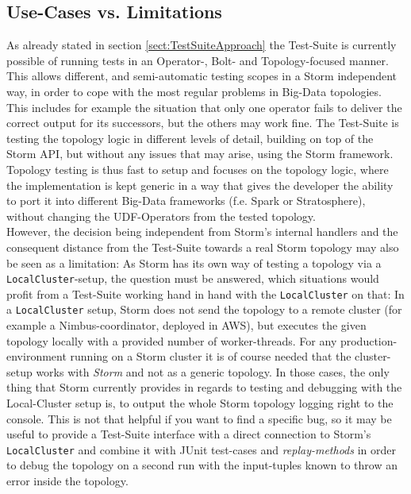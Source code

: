 \subsection{Use-Cases vs. Limitations}
\label{sect:TestSuiteUseCases}
	As already stated in section \ref{sect:TestSuiteApproach} the Test-Suite is currently possible of running tests in an Operator-, Bolt- and Topology-focused manner. This allows different, and semi-automatic testing scopes in a Storm independent way, in order to cope with the most regular problems in Big-Data topologies. This includes for example the situation that only one operator fails to deliver the correct output for its successors, but the others may work fine. The Test-Suite is testing the topology logic in different levels of detail, building on top of the Storm API, but without any issues that may arise, using the Storm framework. Topology testing is thus fast to setup and focuses on the topology logic, where the implementation is kept generic in a way that gives the developer the ability to port it into different Big-Data frameworks (f.e. Spark or Stratosphere), without changing the UDF-Operators from the tested topology. \\ %

	However, the decision being independent from Storm's internal handlers and the consequent distance from the Test-Suite towards a real Storm topology may also be seen as a limitation: As Storm has its own way of testing a topology via a \texttt{LocalCluster}-setup, the question must be answered, which situations would profit from a Test-Suite working hand in hand with the \texttt{LocalCluster} on that: In a \texttt{LocalCluster} setup, Storm does not send the topology to a remote cluster (for example a Nimbus-coordinator, deployed in AWS), but executes the given topology locally with a provided number of worker-threads. For any production-environment running on a Storm cluster it is of course needed that the cluster-setup works with \textit{Storm} and not as a generic topology. In those cases, the only thing that Storm currently provides in regards to testing and debugging with the Local-Cluster setup is, to output the whole Storm topology logging right to the console. 
	This is not that helpful if you want to find a specific bug, so it may be useful to provide a Test-Suite interface with a direct connection to Storm's \texttt{LocalCluster} and combine it with JUnit test-cases and \textit{replay-methods} in order to debug the topology on a second run with the input-tuples known to throw an error inside the topology.
	